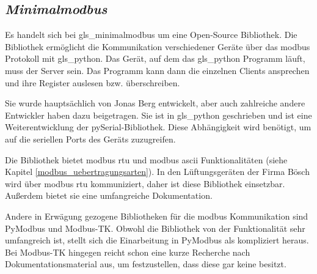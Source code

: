 \subsection{\textit{Minimalmodbus}} \label{minimalmodbus}
Es handelt sich bei \gls{gls_minimalmodbus} um eine Open-Source Bibliothek. Die Bibliothek ermöglicht die Kommunikation verschiedener Geräte über das \gls{modbus} Protokoll mit \gls{gls_python}. Das Gerät, auf dem das \gls{gls_python} Programm läuft, muss der Server sein. Das Programm kann dann die einzelnen Clients ansprechen und ihre Register auslesen bzw. überschreiben.

Sie wurde hauptsächlich von Jonas Berg entwickelt, aber auch zahlreiche andere Entwickler haben dazu beigetragen. Sie ist in \gls{gls_python} geschrieben und ist eine Weiterentwicklung der pySerial-Bibliothek. Diese Abhängigkeit wird benötigt, um auf die seriellen Ports des Geräts zuzugreifen. \cite[vgl.][]{Liechti_pySerial:o.J.}

Die Bibliothek bietet \gls{modbus} \acs{rtu} und \gls{modbus} \acs{ascii} Funktionalitäten (siehe Kapitel \ref{modbus_uebertragungsarten}). In den Lüftungsgeräten der Firma Bösch wird über \gls{modbus} \acs{rtu} kommuniziert, daher ist diese Bibliothek einsetzbar. Außerdem bietet sie eine umfangreiche Dokumentation.
\cite[vgl.][]{Berg_MiniModbus:2023, Berg_MiniModbus_Git:2023} 

Andere in Erwägung gezogene Bibliotheken für die \gls{modbus} Kommunikation sind PyModbus und Modbus-TK. Obwohl die Bibliothek von der Funktionalität sehr umfangreich ist, stellt sich die Einarbeitung in PyModbus als kompliziert heraus. Bei Modbus-TK hingegen reicht schon eine kurze Recherche nach Dokumentationsmaterial aus, um festzustellen, dass diese gar keine besitzt.